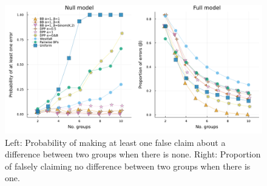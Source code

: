 \documentclass[]{article}
\title{}
\author{}
\begin{document}
\begin{figure}
	\centering
	\includegraphics[width=1\textwidth]{2_panel_alpha_familywise.pdf}
	\caption{Left: Probability of making at least one false claim about a difference between two groups when there is none. Right: Proportion of falsely claiming no difference between two groups when there is one. %
	}
	\label{fig:small_simulation}
\end{figure}
\end{document}
